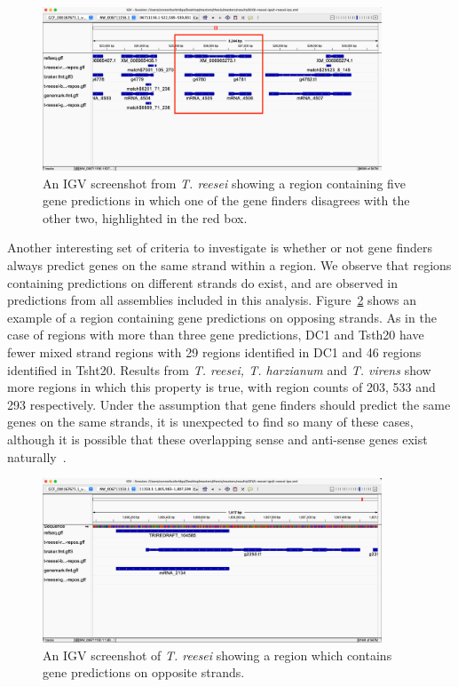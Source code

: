 \begin{figure}
  \centering
  \includegraphics[width=0.9\textwidth]{figures/igv/igv-uncertain-regions.png}
  \caption[Example of a region with many gene calls]{An IGV screenshot
    from \textit{T. reesei} showing a region containing five gene
    predictions in which one of the gene finders disagrees with the
    other two, highlighted in the red box.}
  \label{fig:uncertain-regions}
\end{figure}

Another interesting set of criteria to investigate is whether or not
gene finders always predict genes on the same strand within a
region. We observe that regions containing predictions on different
strands do exist, and are observed in predictions from all assemblies
included in this analysis. Figure~\ref{fig:opposing-strands} shows an
example of a region containing gene predictions on opposing
strands. As in the case of regions with more than three gene
predictions, DC1 and Tsth20 have fewer mixed strand regions with 29
regions identified in DC1 and 46 regions identified in Tsht20. Results
from \textit{T. reesei, T. harzianum} and \textit{T. virens} show more
regions in which this property is true, with region counts of 203, 533
and 293 respectively. Under the assumption that gene finders should
predict the same genes on the same strands, it is unexpected to find
so many of these cases, although it is possible that these overlapping
sense and anti-sense genes exist naturally~\cite{Wright2022}.

\begin{figure}
  \centering
  \includegraphics[width=0.9\textwidth]{figures/igv/igv-opposing-strands.png}
  \caption[Predictions on opposing strands]{An IGV screenshot of
    \textit{T. reesei} showing a region which contains gene
    predictions on opposite strands.}
  \label{fig:opposing-strands}
\end{figure}

